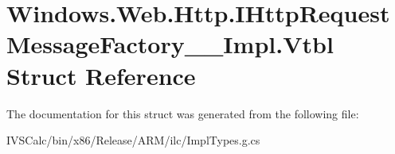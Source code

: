 \hypertarget{struct_windows_1_1_web_1_1_http_1_1_i_http_request_message_factory_____impl_1_1_vtbl}{}\section{Windows.\+Web.\+Http.\+I\+Http\+Request\+Message\+Factory\+\_\+\+\_\+\+Impl.\+Vtbl Struct Reference}
\label{struct_windows_1_1_web_1_1_http_1_1_i_http_request_message_factory_____impl_1_1_vtbl}


The documentation for this struct was generated from the following file\+:\begin{DoxyCompactItemize}
\item 
I\+V\+S\+Calc/bin/x86/\+Release/\+A\+R\+M/ilc/Impl\+Types.\+g.\+cs\end{DoxyCompactItemize}

